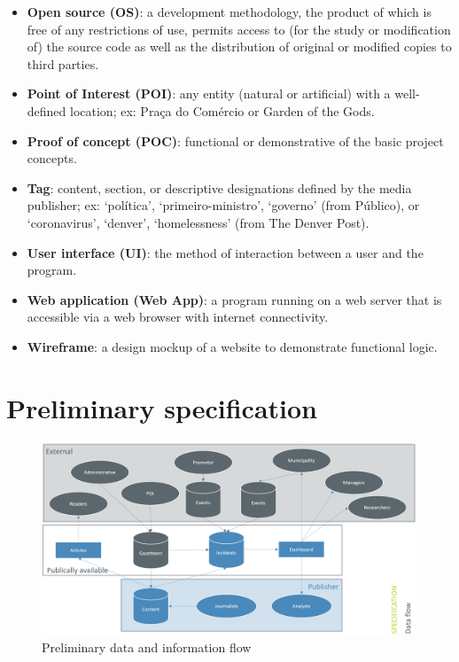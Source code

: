 \begin{itemize}
	\item[] \textbf{Open source (OS)}: a development methodology, the product of which is free of any restrictions of use, permits access to (for the study or modification of) the source code as well as the distribution of original or modified copies to third parties.
	\item[] \textbf{Point of Interest (POI)}: any entity (natural or artificial) with a well-defined location; ex: Praça do Comércio or Garden of the Gods.
	\item[] \textbf{Proof of concept (POC)}: functional or demonstrative of the basic project concepts.
	\item[] \textbf{Tag}: content, section, or descriptive designations defined by the media publisher; ex: ‘política’, ‘primeiro-ministro’, ‘governo’ (from Público), or ‘coronavirus’, ‘denver’, ‘homelessness’ (from The Denver Post).
	\item[] \textbf{User interface (UI)}: the method of interaction between a user and the program.
	\item[] \textbf{Web application (Web App)}: a program running on a web server that is accessible via a web browser with internet connectivity.
	\item[] \textbf{Wireframe}: a design mockup of a website to demonstrate functional logic.
\end{itemize}

\newpage
\section{Preliminary specification} \label{appendix:organization}
\begin{figure}[H]
	\centering
	\includegraphics[width=.9\linewidth]{images/information_flow.png}
	\caption{Preliminary data and information flow}
	\label{fig:info_flow}
\end{figure}

